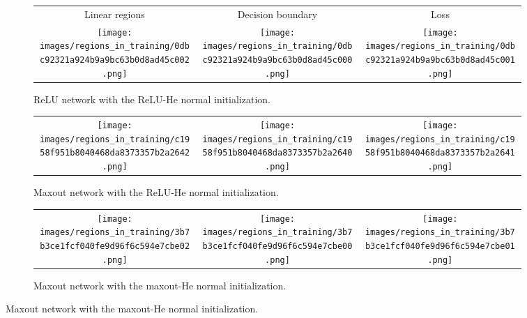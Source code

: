 \documentclass{article}
\theoremstyle{definition}
\begin{document}
\begin{figure}

    \begin{subfigure}{\textwidth}
        \setlength\tabcolsep{2pt}
        \begin{tabular}{ccc}
            \centering
            \small{Linear regions} &
            \small{Decision boundary} &
            \small{Loss}  \\
            
            \texttt{[image: images/regions\_in\_training/0dbc92321a924b9a9bc63b0d8ad45c002.png]} &
            \texttt{[image: images/regions\_in\_training/0dbc92321a924b9a9bc63b0d8ad45c000.png]} &
            \texttt{[image: images/regions\_in\_training/0dbc92321a924b9a9bc63b0d8ad45c001.png]}
        \end{tabular}
        \caption{\small ReLU network with the ReLU-He normal initialization.}
    \end{subfigure}
    \vspace{.2cm}

    \begin{subfigure}{\textwidth}
        \setlength\tabcolsep{2pt}
        \begin{tabular}{ccc}
            \centering
            \texttt{[image: images/regions\_in\_training/c1958f951b8040468da8373357b2a2642.png]} &
            \texttt{[image: images/regions\_in\_training/c1958f951b8040468da8373357b2a2640.png]} &
            \texttt{[image: images/regions\_in\_training/c1958f951b8040468da8373357b2a2641.png]}
        \end{tabular}
        \caption{\small Maxout network with the ReLU-He normal initialization.}
    \end{subfigure}
    \vspace{.2cm}

    \begin{subfigure}{\textwidth}
        \setlength\tabcolsep{2pt}
        \begin{tabular}{ccc}
            \centering
            \texttt{[image: images/regions\_in\_training/3b7b3ce1fcf040fe9d96f6c594e7cbe02.png]} &
            \texttt{[image: images/regions\_in\_training/3b7b3ce1fcf040fe9d96f6c594e7cbe00.png]} &
            \texttt{[image: images/regions\_in\_training/3b7b3ce1fcf040fe9d96f6c594e7cbe01.png]}
        \end{tabular}
        \caption{\small Maxout network with the maxout-He normal initialization.}
    \end{subfigure}
    \vspace{.2cm}


\end{figure}
\end{document}
